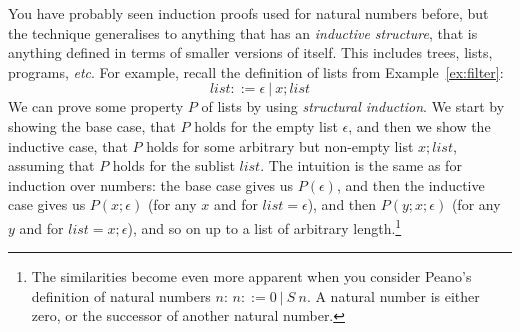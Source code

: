 \documentclass{tufte-handout}
\newcounter{example}
\begin{document}
You have probably seen induction proofs used for natural numbers
before, but the technique generalises to anything that has an
\emph{inductive structure}, that is anything defined in terms of
smaller versions of itself. This includes trees, lists, programs,
\emph{etc}.
%
For example, recall the definition of lists from
Example~\ref{ex:filter}:
\[
  \mathit{list} ::= \epsilon ~|~ x; \mathit{list}
\]
We can prove some property $P$ of lists by using \emph{structural
  induction}. We start by showing the base case, that $P$ holds
for the empty list $\epsilon$, and then we show the inductive
case, that $P$ holds for some arbitrary but non-empty list
$x;\mathit{list}$, assuming that $P$ holds for the sublist
$\mathit{list}$.
%
The intuition is the same as for induction over numbers: the base
case gives us $P(\epsilon)$, and then the inductive case gives us
$P(x;\epsilon)$ (for any $x$ and for $\mathit{list} = \epsilon$),
and then $P(y;x;\epsilon)$ (for any $y$ and for
$\mathit{list} = x;\epsilon$), and so on up to a list of arbitrary
length.\footnote{The similarities become even more apparent when
  you consider Peano's definition of natural numbers $n$:
  $n ::= 0 ~|~ S~n$. A natural number is either zero, or the
  successor of another natural number. }
\end{document}
